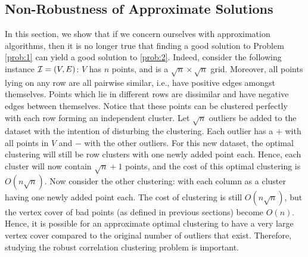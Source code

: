 \subsection{Non-Robustness of Approximate Solutions}
In this section, we show that if we concern ourselves with approximation algorithms, then it is no longer true that finding a good solution to Problem \ref{prob:1} can yield a good solution to \ref{prob:2}. Indeed, consider the following instance ${\cal I} = (V,E)$:  $V$ has $n$ points, and is a $\sqrt{n} \times \sqrt{n}$ grid. Moreover, all points lying on any row are all pairwise similar, i.e., have positive edges amongst themselves. Points which lie in different rows are dissimilar and have negative edges between themselves. Notice that these points can be clustered perfectly with each row forming an independent cluster. Let $\sqrt{n}$ outliers be added to the dataset with the intention of disturbing the clustering. Each outlier has a $+$ with all points in $V$ and $-$ with the other outliers. For this new dataset, the optimal clustering will still be row clusters with one newly added point each. Hence, each cluster will now contain $\sqrt{n}+1$ points, and the cost of this optimal clustering is $O(n\sqrt{n})$. Now consider the other clustering: with each column as a cluster having one newly added point each. The cost of clustering is still $O(n\sqrt{n})$, but the vertex cover of bad points (as defined in previous sections) become $O(n)$. Hence, it is possible for an approximate optimal clustering to have a very large vertex cover compared to the original number of outliers that exist. Therefore, studying the robust correlation clustering problem is important.
